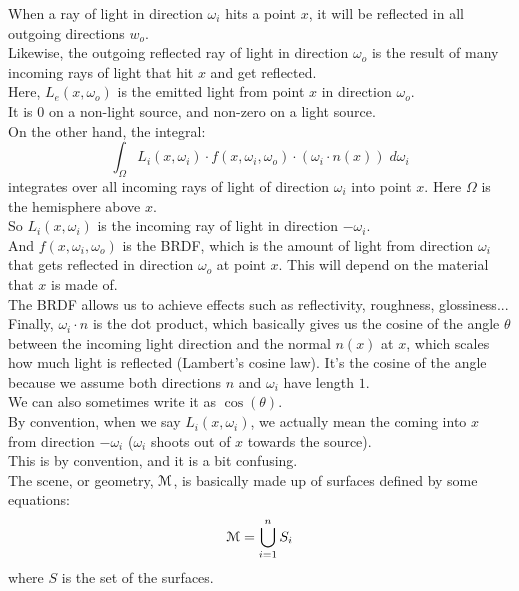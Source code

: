 \documentclass[12pt]{article}
\begin{document}
When a ray of light in direction $\omega_i$
hits a point $x$, it will be reflected in all 
outgoing directions $w_o$. \\
Likewise, the outgoing reflected ray of light in
direction $\omega_o$ is the result of many incoming
rays of light that hit $x$ and get reflected. \\

Here, $L_{e}(x, \omega_o)$ is the emitted light 
from point $x$ in direction $\omega_o$. \\
It is $0$ on a non-light source, and non-zero
on a light source. \\
 
On the other hand, the integral:
\[ \int_\Omega L_{i}(x, \omega_i) \cdot
f(x, \omega_i, \omega_o) \cdot
(\omega_i \cdot n(x)) \; d\omega_i \]
integrates over all incoming rays of light
of direction $\omega_i$ into point $x$.
Here $\Omega$ is the hemisphere above $x$. \\

So $L_{i}(x, \omega_i)$ is the incoming ray
of light in direction $-\omega_i$. \\

And $f(x, \omega_i, \omega_o)$ is the BRDF, 
which is the amount of light from direction $\omega_i$
that gets reflected in direction $\omega_o$
at point $x$.
This will depend on the material that $x$ is made of. \\
The BRDF allows us to achieve effects such as reflectivity,
roughness, glossiness... \\ 

Finally, $\omega_i \cdot n$ is the dot product,
which basically gives us the cosine of the angle $\theta$
between the incoming light direction and the normal
$n(x)$ at $x$, which scales how much light is reflected
(Lambert's cosine law).
It's the cosine of the angle because we 
assume both directions $n$ and $\omega_i$
have length $1$. \\
We can also sometimes write it as $\cos(\theta)$. \\

By convention, when we say $L_i(x, \omega_i)$,
we actually mean the coming into $x$
from direction $-\omega_i$
($\omega_i$ shoots out of $x$ towards the source). \\
This is by convention, and it is a bit confusing. \\

The scene, or geometry,
$\mathcal{M}$, is basically made up of surfaces defined
by some equations:
\[ \mathcal{M} = \bigcup_{i=1}^{n} S_i \]
where $S$ is the set of the surfaces. \\
\end{document}
